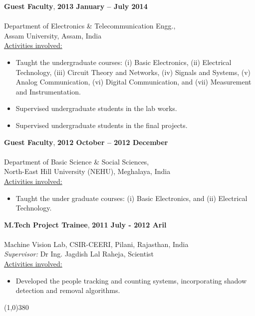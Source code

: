 \documentclass[10pt]{article}
\begin{document}
\textbf{Guest Faculty},  \hfill \textbf{2013 January -- July 2014}\\ \\
         Department of Electronics \& Telecommunication Engg.,\\ Assam University, Assam, India  \\ 
\underline{Activities involved:}
\begin{itemize}
\item Taught the undergraduate courses: (i) Basic Electronics,  (ii) Electrical Technology, (iii) Circuit Theory and Networks, (iv) Signals and Systems, (v) Analog Communication, (vi) Digital Communication, and (vii) Measurement and Instrumentation.
\item Supervised undergraduate students in the lab works.
\item Supervised undergraduate students in the final projects.\\
\end{itemize}


\textbf{Guest Faculty},  \hfill \textbf{2012 October -- 2012 December}\\ \\
         Department of Basic Science \& Social Sciences,\\ North-East Hill University (NEHU), Meghalaya, India  \\ 
\underline{Activities involved:}
\begin{itemize}
\item Taught the under graduate courses: (i) Basic Electronics, and (ii) Electrical Technology. 
\end{itemize}
 
\textbf{M.Tech Project Trainee},  \hfill \textbf{2011 July - 2012 Aril}\\ \\ 
         Machine Vision Lab, CSIR-CEERI, Pilani, Rajasthan, India  \\ 
         \textit{Supervisor:} Dr Ing. Jagdish Lal Raheja, Scientist\\ 
\underline{Activities involved:}
\begin{itemize}
\item Developed the people tracking and counting systems, incorporating shadow detection and removal algorithms.
\end{itemize}

 \line(1,0){380}

 
\end{document}
